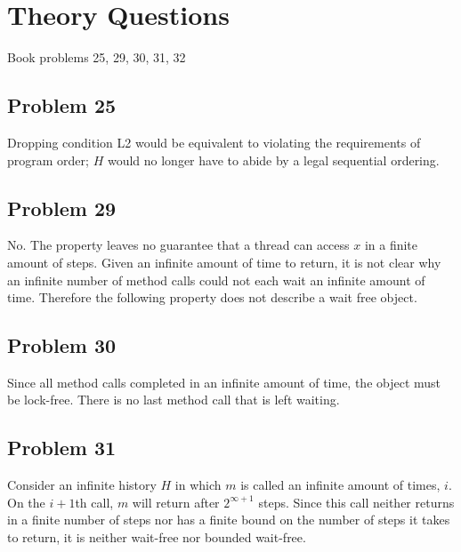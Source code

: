 \documentclass[]{article}
\begin{document}
\section{Theory Questions}
Book problems 25, 29, 30, 31, 32

\subsection{Problem 25}
Dropping condition L2 would be equivalent to violating the requirements of program order; $H$ would no longer have to abide by a legal sequential ordering.

\subsection{Problem 29}
No. The property leaves no guarantee that a thread can access $x$ in a finite amount of steps. Given an infinite amount of time to return, it is not clear why an infinite number of method calls could not each wait an infinite amount of time. Therefore the following property does not describe a wait free object.

\subsection{Problem 30}
Since all method calls completed in an infinite amount of time, the object must be lock-free. There is no last method call that is left waiting.

\subsection{Problem 31}
Consider an infinite history $H$ in which $m$ is called an infinite amount of times, $i$. On the $i + 1$th call, $m$ will return after $2^{\infty + 1}$ steps. Since this call neither returns in a finite number of steps nor has a finite bound on the number of steps it takes to return, it is neither wait-free nor bounded wait-free.
\end{document}
